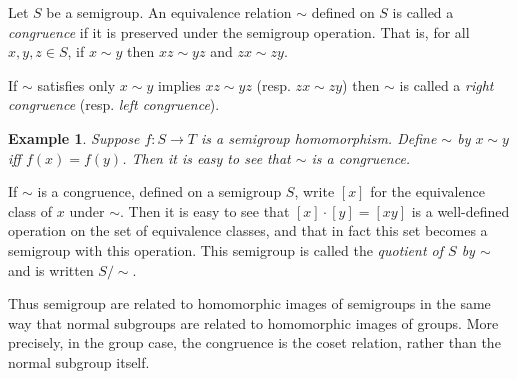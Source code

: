 \documentclass[12pt]{article}
\newtheorem*{example}{Example}
\begin{document}
Let $S$ be a semigroup.  An equivalence relation $\sim$ defined on $S$ is called a \emph{congruence} if it is preserved under the semigroup operation.  That is, for all $x, y, z \in S$, if $x \sim y$ then $xz \sim yz$ and $zx \sim zy$.

If $\sim$ satisfies only $x \sim y$ implies $xz \sim yz$ (resp. $zx \sim zy$) then $\sim$ is called a \emph{right congruence} (resp. \emph{left congruence}).

\begin{example}
Suppose $f: S \to T$ is a semigroup homomorphism.  Define $\sim$ by $x \sim y$ iff $f(x) = f(y)$.  Then it is easy to see that $\sim$ is a congruence.
\end{example}

If $\sim$ is a congruence, defined on a semigroup $S$,
write $[x]$ for the equivalence class of $x$ under $\sim$.
Then it is easy to see that $[x] \cdot [y] = [xy]$
is a well-defined operation on the set of equivalence classes,
and that in fact this set becomes a semigroup with this operation.
This semigroup is called the \emph{quotient of $S$ by $\sim$}
and is written $S/\sim$.

Thus semigroup  are related to homomorphic images of semigroups in the same way that normal subgroups are related to homomorphic images of groups.  More precisely, in the group case, the congruence is the coset relation, rather than the normal subgroup itself.
\end{document}
